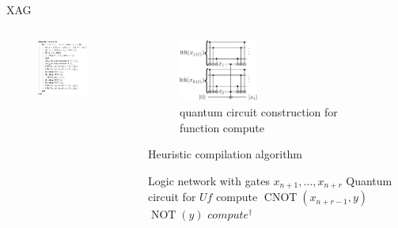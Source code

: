   \begin{frame}{XAG}
    \begin{columns}
      \begin{column}{0.48\linewidth}
        \begin{figure}[h]
          \centering
          \includegraphics[width=0.8\textwidth]{figure/function.png}
          \label{fig-function}
        \end{figure}
      \end{column}
      \begin{column}{0.48\linewidth}
        \begin{figure}[h]
          \centering
          \includegraphics[width=0.4\textwidth]{figure/construction.png}
          \caption{quantum circuit construction for function compute}
          \label{fig-construction}
        \end{figure}
        \begin{algorithm}[H]
           \scriptsize
          \caption{Heuristic compilation algorithm} 
          \label{alg-be} 
          \begin{algorithmic}
            \REQUIRE Logic network with gates $x_{n+1}, \dots, x_{n+r}$
            \ENSURE Quantum circuit for $Uf$
            \STATE compute
            \STATE $\operatorname{CNOT}(x_{n+r-1},y)$
            \STATE $\operatorname{NOT}(y)$
            \ENDIF
            \STATE $compute^{\dagger}$
          \end{algorithmic} 
        \end{algorithm}
      \end{column}
    \end{columns}
  \end{frame}
  
